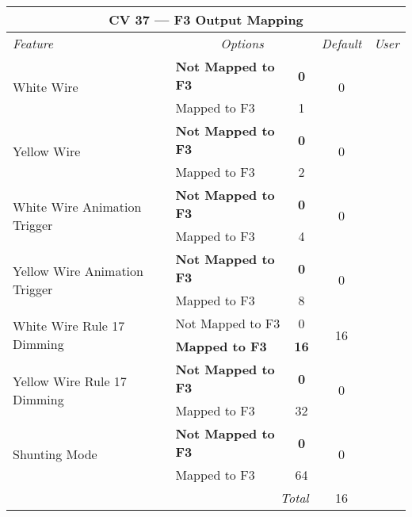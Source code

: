 \documentclass[12pt,letterpaper,draft]{memoir} %
\begin{document}
\label{CV37}
\begin{center}
\begin{tabular}{|l|lc|c|c|}
\hline
\multicolumn{5}{|c|}{\textbf{CV 37 --- F3 Output Mapping}} \\ \hline \hline
\textit{Feature} & \multicolumn{2}{c|}{\textit{Options}} & \textit{Default} & \textit{User} \\ \hline
\multirow{2}{*}{White Wire} & \textbf{Not Mapped to F3} & \textbf{0}	& 	\multirow{2}{*}{0}&\\
                            & Mapped to F3 & 1 & & \\ \hline
\multirow{2}{*}{Yellow Wire} & \textbf{Not Mapped to F3} & \textbf{0}	& 	\multirow{2}{*}{0}&\\
                            & Mapped to F3 & 2 & & \\ \hline
\multirow{2}{*}{White Wire Animation Trigger} & \textbf{Not Mapped to F3} & \textbf{0}	& 	\multirow{2}{*}{0}& \\
                           & Mapped to F3 & 4 & & \\ \hline
\multirow{2}{*}{Yellow Wire Animation Trigger} & \textbf{Not Mapped to F3} & \textbf{0}	& 	\multirow{2}{*}{0}& \\
                           & Mapped to F3 & 8 & & \\ \hline
\multirow{2}{*}{White Wire Rule 17 Dimming} & Not Mapped to F3 & 0	& 	\multirow{2}{*}{16}& \\
                             & \textbf{Mapped to F3} & \textbf{16} & & \\ \hline
\multirow{2}{*}{Yellow Wire Rule 17 Dimming} & \textbf{Not Mapped to F3} & \textbf{0}	& 	\multirow{2}{*}{0}&\\
                             & Mapped to F3 & 32 & & \\ \hline
\multirow{2}{*}{Shunting Mode} & \textbf{Not Mapped to F3} & \textbf{0}	& 	\multirow{2}{*}{0}&\\
                             & Mapped to F3 & 64 & & \\ \hline\hline
\multicolumn{3}{|r|}{\textit{Total}} & 16 &\\ \hline
\end{tabular}
\end{center}
\end{document}
